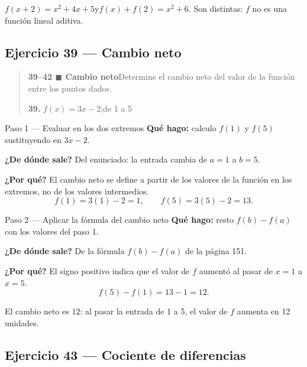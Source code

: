 \documentclass[11pt]{article}
\begin{document}
\begin{resp}
$f(x+2)=x^2+4x+5$\quad y\quad $f(x)+f(2)=x^2+6$. Son distintas: $f$ no es una función lineal aditiva.
\end{resp}

\subsection*{Ejercicio 39 — Cambio neto}

\begin{quote}
\textbf{39--42 $\blacksquare$ Cambio neto}\quad Determine el cambio neto del valor de la función entre los puntos dados.

\textbf{39.} $f(x)=3x-2$;\quad de 1 a 5
\end{quote}

\begin{paso}{Paso 1 --- Evaluar en los dos extremos}
\textbf{Qué hago:} calculo $f(1)$ y $f(5)$ sustituyendo en $3x-2$.

\textbf{¿De dónde sale?} Del enunciado: la entrada cambia de $a=1$ a $b=5$.

\textbf{¿Por qué?} El cambio neto se define a partir de los valores de la función en los extremos, no de los valores intermedios.
\[
f(1)=3(1)-2=1,\qquad f(5)=3(5)-2=13.
\]
\end{paso}

\begin{paso}{Paso 2 --- Aplicar la fórmula del cambio neto}
\textbf{Qué hago:} resto $f(b)-f(a)$ con los valores del paso 1.

\textbf{¿De dónde sale?} De la fórmula $f(b)-f(a)$ de la página 151.

\textbf{¿Por qué?} El signo positivo indica que el valor de $f$ aumentó al pasar de $x=1$ a $x=5$.
\[
f(5)-f(1)=13-1=12.
\]
\end{paso}

\begin{resp}
El cambio neto es $12$: al pasar la entrada de 1 a 5, el valor de $f$ aumenta en 12 unidades.
\end{resp}

\subsection*{Ejercicio 43 — Cociente de diferencias}
\end{document}
